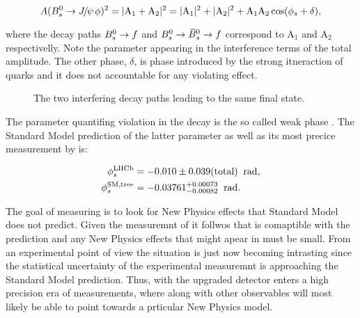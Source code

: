\newcommand{\aOne}{\ensuremath{ \mathrm{A_1}}\xspace}
\newcommand{\aTwo}{\ensuremath{ \mathrm{A_2}}\xspace}
\begin{equation}
  \centering
A(\BsJpsiPhi)^2 = |\aOne + \aTwo|^2 = |\aOne|^2 + |\aTwo|^2 + \aOne\aTwo\cos(\phis + \delta),
  \label{app_interf_amp}
\end{equation}

\noindent where the decay paths $B^0_s\rightarrow f$ and $B^0_s \rightarrow \kern 0.18em\overline{\kern -0.18em B}{}^0_s \rightarrow f$ correspond to \aOne and \aTwo
respectivelly. Note the \phis parameter appearing in the interference terms of the total amplitude.
The other phase, $\delta$, is phase introduced by the strong itneraction of quarks and it does not
accountable for any \CP violating effect.

\begin{figure}[h]
  \centering
  \resizebox{0.4\textwidth}{!}{}
  \caption{The two interfering decay paths leading to the same final state.}
  \label{app_interference}
\end{figure}

The parameter quantifing \CP violation in the \BsJpsiPhi decay is the so called weak phase \phis.
The Standard Model prediction of the latter parameter as well as its most precice measurement by
\lhcb is:

\begin{subequations}
  \label{app_phis_lhcb_theo}
  \begin{align}
  \centering
  \phiS{\lhcb}           &=  -0.010 \pm 0.039(\text{total})  \;\; \text{rad},
  \label{app_phis_lhcb}\\
  \phiS{SM,tree}  &= -0.03761 {}^{+0.00073}_{-0.00082}  \;\; \text{rad}.
  \label{app_phis_theo}
\end{align}
\end{subequations}

\noindent The goal of measuring \phis is to look for New Physics effects that Standard Model
does not predict. Given the measuremnt of  it follwos that \phis is comaptible
with the prediction and any New Physics effects that might apear in \phis must be small.
From an experimental point of view the situation is just now becoming intrasting
since the statistical uncertainty of the experimental measuremnt is approaching the Standard
Model prediction. Thus, with the upgraded \lhcb detector \phis enters a high precision era
of measurements, where along with other observables will most likely be able to point towards
a prticular New Physics model.


